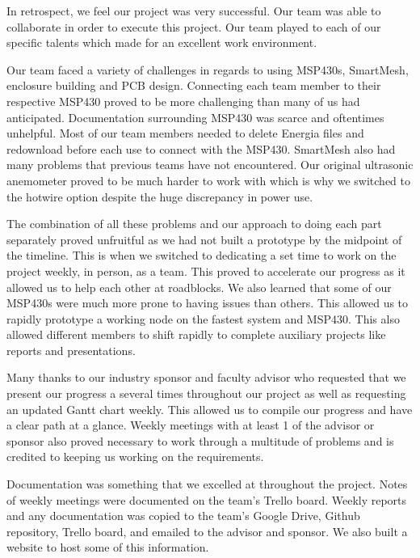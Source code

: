 In retrospect, we feel our project was very successful. Our team was able to collaborate in order to execute this project. Our team played to each of our specific talents which made for an excellent work environment.

Our team faced a variety of challenges in regards to using MSP430s, SmartMesh, enclosure building and PCB design. Connecting each team member to their respective MSP430 proved to be more challenging than many of us had anticipated. Documentation surrounding MSP430 was scarce and oftentimes unhelpful. Most of our team members needed to delete Energia files and redownload before each use to connect with the MSP430. SmartMesh also had many problems that previous teams have not encountered. Our original ultrasonic anemometer proved to be much harder to work with which is why we switched to the hotwire option despite the huge discrepancy in power use.

The combination of all these problems and our approach to doing each part separately proved unfruitful as we had not built a prototype by the midpoint of the timeline. This is when we switched to dedicating a set time to work on the project weekly, in person, as a team. This proved to accelerate our progress as it allowed us to help each other at roadblocks. We also learned that some of our MSP430s were much more prone to having issues than others. This allowed us to rapidly prototype a working node on the fastest system and MSP430. This also allowed different members to shift rapidly to complete auxiliary projects like reports and presentations.

Many thanks to our industry sponsor and faculty advisor who requested that we present our progress a several times throughout our project as well as requesting an updated Gantt chart weekly. This allowed us to compile our progress and have a clear path at a glance. Weekly meetings with at least 1 of the advisor or sponsor also proved necessary to work through a multitude of problems and is credited to keeping us working on the requirements. 

Documentation was something that we excelled at throughout the project. Notes of weekly meetings were documented on the team’s Trello board. Weekly reports and any documentation was copied to the team’s Google Drive, Github repository, Trello board, and emailed to the advisor and sponsor. We also built a website to host some of this information.

